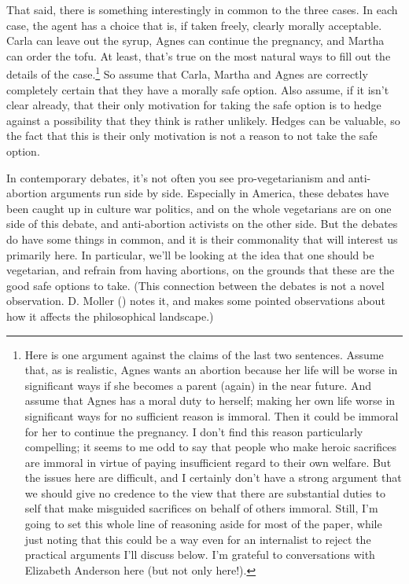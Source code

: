 \documentclass[
  11pt,
  letterpaper,
  DIV=11,
  numbers=noendperiod,
  twoside]{scrartcl}
\begin{document}
That said, there is something interestingly in common to the three
cases. In each case, the agent has a choice that is, if taken freely,
clearly morally acceptable. Carla can leave out the syrup, Agnes can
continue the pregnancy, and Martha can order the tofu. At least, that's
true on the most natural ways to fill out the details of the
case.\footnote{Here is one argument against the claims of the last two
  sentences. Assume that, as is realistic, Agnes wants an abortion
  because her life will be worse in significant ways if she becomes a
  parent (again) in the near future. And assume that Agnes has a moral
  duty to herself; making her own life worse in significant ways for no
  sufficient reason is immoral. Then it could be immoral for her to
  continue the pregnancy. I don't find this reason particularly
  compelling; it seems to me odd to say that people who make heroic
  sacrifices are immoral in virtue of paying insufficient regard to
  their own welfare. But the issues here are difficult, and I certainly
  don't have a strong argument that we should give no credence to the
  view that there are substantial duties to self that make misguided
  sacrifices on behalf of others immoral. Still, I'm going to set this
  whole line of reasoning aside for most of the paper, while just noting
  that this could be a way even for an internalist to reject the
  practical arguments I'll discuss below. I'm grateful to conversations
  with Elizabeth Anderson here (but not only here!).} So assume that
Carla, Martha and Agnes are correctly completely certain that they have
a morally safe option. Also assume, if it isn't clear already, that
their only motivation for taking the safe option is to hedge against a
possibility that they think is rather unlikely. Hedges can be valuable,
so the fact that this is their only motivation is not a reason to not
take the safe option.

In contemporary debates, it's not often you see pro-vegetarianism and
anti-abortion arguments run side by side. Especially in America, these
debates have been caught up in culture war politics, and on the whole
vegetarians are on one side of this debate, and anti-abortion activists
on the other side. But the debates do have some things in common, and it
is their commonality that will interest us primarily here. In
particular, we'll be looking at the idea that one should be vegetarian,
and refrain from having abortions, on the grounds that these are the
good safe options to take. (This connection between the debates is not a
novel observation. D. Moller ()
notes it, and makes some pointed observations about how it affects the
philosophical landscape.)
\end{document}
